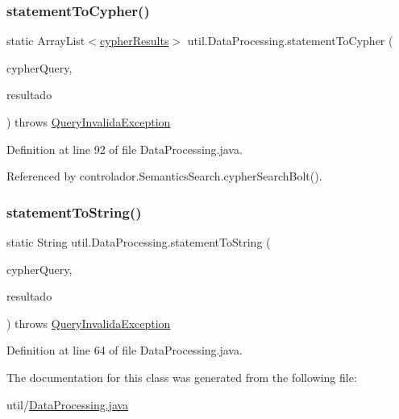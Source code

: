 \subsubsection{\texorpdfstring{statement\+To\+Cypher()}{statementToCypher()}}
{\footnotesize\ttfamily static Array\+List$<$\hyperlink{classentidade_1_1resultados_1_1cypherResults}{cypher\+Results}$>$ util.\+Data\+Processing.\+statement\+To\+Cypher (\begin{DoxyParamCaption}\item[{String}]{cypher\+Query,  }\item[{Statement\+Result}]{resultado }\end{DoxyParamCaption}) throws \hyperlink{classexcessao_1_1QueryInvalidaException}{Query\+Invalida\+Exception}\hspace{0.3cm}{\ttfamily [static]}}



Definition at line 92 of file Data\+Processing.\+java.



Referenced by controlador.\+Semantics\+Search.\+cypher\+Search\+Bolt().

\hypertarget{classutil_1_1DataProcessing_ae56c5b29df8fc14baf4abac4bd225fd8}{}\label{classutil_1_1DataProcessing_ae56c5b29df8fc14baf4abac4bd225fd8} 
\subsubsection{\texorpdfstring{statement\+To\+String()}{statementToString()}}
{\footnotesize\ttfamily static String util.\+Data\+Processing.\+statement\+To\+String (\begin{DoxyParamCaption}\item[{String}]{cypher\+Query,  }\item[{Statement\+Result}]{resultado }\end{DoxyParamCaption}) throws \hyperlink{classexcessao_1_1QueryInvalidaException}{Query\+Invalida\+Exception}\hspace{0.3cm}{\ttfamily [static]}}



Definition at line 64 of file Data\+Processing.\+java.



The documentation for this class was generated from the following file\+:\begin{DoxyCompactItemize}
\item 
util/\hyperlink{DataProcessing_8java}{Data\+Processing.\+java}\end{DoxyCompactItemize}
